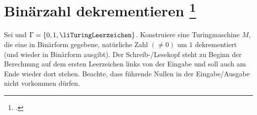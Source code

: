 \documentclass{bschlangaul-aufgabe}
\begin{document}
\let\t=\liTuringUebergangZelle

\section{Binärzahl dekrementieren
\footcite[Aufgabe 3]{theo:ab:3}}

Sei  und $\Gamma = \{ 0, 1, \liTuringLeerzeichen \}$.
Konstruiere eine Turingmaschine $M$, die eine in Binärform gegebene,
natürliche Zahl $(\neq 0)$ um $1$ dekrementiert (und wieder in Binärform
ausgibt). Der Schreib-/Lesekopf steht zu Beginn der Berechnung auf dem
ersten Leerzeichen links von der Eingabe und soll auch am Ende wieder
dort stehen. Beachte, dass führende Nullen in der Eingabe/Ausgabe nicht
vorkommen dürfen.
\end{document}
